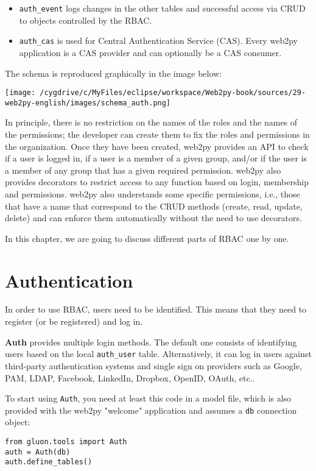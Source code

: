 \documentclass[justified,sixbynine,notoc]{tufte-book}
\def\ft{\small\tt}
\begin{document}
\begin{fullwidth}
\begin{itemize}
\item {\ft auth\_event} logs changes in the other tables and successful access via CRUD to objects controlled by the RBAC.

\item {\ft auth\_cas} is used for Central Authentication Service (CAS). Every web2py application is a CAS provider and can optionally be a CAS consumer.
\end{itemize}

The schema is reproduced graphically in the image below:


\goodbreak\begin{center}\texttt{[image: /cygdrive/c/MyFiles/eclipse/workspace/Web2py-book/sources/29-web2py-english/images/schema\_auth.png]}\end{center}


In principle, there is no restriction on the names of the roles and the names of the permissions; the developer can create them to fix the roles and permissions in the organization. Once they have been created, web2py provides an API to check if a user is logged in, if a user is a member of a given group, and/or if the user is a member of any group that has a given required permission.
\noindent web2py also provides decorators to restrict access to any function based on login, membership and permissions.
\noindent web2py also understands some specific permissions, i.e., those that have a name that correspond to the CRUD methods (create, read, update, delete) and can enforce them automatically without the need to use decorators.

In this chapter, we are going to discuss different parts of RBAC one by one.

\goodbreak\section{Authentication}

In order to use RBAC, users need to be identified. This means that they need to register (or be registered) and log in.

{\bf Auth} provides multiple login methods. The default one consists of identifying users based on the local {\ft auth\_user} table.
Alternatively, it can log in users against third-party authentication systems and single sign on providers such as Google, PAM, LDAP, Facebook, LinkedIn, Dropbox, OpenID, OAuth, etc..

To start using {\ft Auth}, you need at least this code in a model file, which is also provided with the web2py "welcome" application and assumes a {\ft db} connection object:
\begin{lstlisting}
from gluon.tools import Auth
auth = Auth(db)
auth.define_tables()
\end{lstlisting}


\end{fullwidth}
\end{document}
